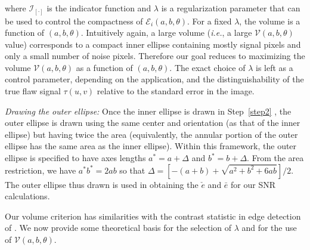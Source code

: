 \documentclass[12pt]{article}
\newenvironment{packed_enum}{
\begin{enumerate}[leftmargin=1.2em]
  \setlength{\itemsep}{1pt}
  \setlength{\parskip}{0pt}
  \setlength{\parsep}{0pt}
}{\end{enumerate}}
\newcommand{\mI}{\mathcal I}
\newcommand{\mE}{\mathcal E}
\newcommand{\mV}{\mathcal V}
\begin{document}
\begin{packed_enum}
\begin{equation}
\end{equation} 
where $\mI_{[\cdot]}$ is the indicator function and 
$\lambda $ is a regularization parameter that can be used to
control the compactness of $\mE_i(a,b,\theta)$. 
For a fixed 
$\lambda $, the volume is a function of $(a, b, \theta)$. 
 Intuitively again, a large volume ({\em i.e.}, a large
 $\mV(a,b,\theta)$  value) corresponds to a compact inner ellipse
 containing mostly 
 signal pixels and only a small number of noise pixels. Therefore our
 goal reduces to maximizing the volume $\mV(a,b,\theta)$ as
 a function of $(a,b,\theta)$. 
The exact choice of $\lambda$ is left as a control parameter,
depending on the application, and the distinguishability of the true
flaw signal $\tau(u,v)$ relative to the standard error in the image.  

\item \label{step3} 
{\em Drawing the outer ellipse:}
Once the inner ellipse is drawn in Step~\ref{step2} , the outer
ellipse is drawn using the 
same center and orientation (as that of the inner ellipse) but
having twice the area (equivalently, the annular portion of the outer
ellipse has the same area as the inner ellipse). Within this
framework, the outer ellipse is specified to have axes lengths $a^* =
a+\Delta$ and $b^* = b +\Delta$. From the area restriction, we have
$a^*b^* = 2ab$ so that $\Delta =  [-(a+b) + \sqrt{a^2+b^2 + 6ab}]/2$. The 
outer ellipse thus drawn is used in obtaining the $\check e$ and $\bar
e$ for our SNR calculations.  
\end{packed_enum}
Our volume criterion has
similarities with the contrast statistic in edge detection of
 \citet{osullivanandqian94}. We now provide some theoretical basis
for the selection of $\lambda$ and  for the use of
$\mV(a,b,\theta)$. 
\end{document}
